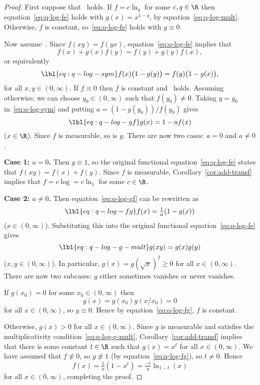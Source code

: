 \begin{proof}
First suppose that~ holds.  If $f = c\ln_q$ for some
$c, q \in \R$ then equation~\eqref{eq:q-log-fe} holds with $g(x) = x^{1 -
  q}$, by equation~\eqref{eq:q-log-mult}.  Otherwise, $f$ is constant,
so~\eqref{eq:q-log-fe} holds with $g \equiv 0$.

Now assume~.  Since $f(xy) = f(yx)$,
equation~\eqref{eq:q-log-fe} implies that
\[
f(x) + g(x) f(y) = f(y) + g(y) f(x),
\]
or equivalently
% 
\begin{equation}
\lbl{eq:q-log-sym}
f(x) \bigl(1 - g(y)\bigr) = f(y) \bigl(1 - g(x)\bigr),
\end{equation}
% 
for all $x, y \in (0, \infty)$.  If $f \equiv 0$ then $f$ is constant
and~ holds.  Assuming otherwise, we can choose $y_0
\in (0, \infty)$ such that $f(y_0) \neq 0$.  Taking $y = y_0$
in~\eqref{eq:q-log-sym} and putting $a = (1 - g(y_0))/f(y_0)$ gives
% 
\begin{equation}
\lbl{eq:q-log-gf}
g(x) = 1 - af(x)
\end{equation}
% 
($x \in \R$).  Since $f$ is measurable, so is $g$.  There are now two
cases: $a = 0$ and $a \neq 0$.

\textbf{Case 1: $a = 0$.}  Then $g \equiv 1$, so the original functional
equation~\eqref{eq:q-log-fe} states that $f(xy) = f(x) + f(y)$.  Since $f$
is measurable, Corollary~\ref{cor:add-transf}
implies that $f = c \log = c \ln_1$ for some $c \in \R$.

\textbf{Case 2: $a \neq 0$.}  Then equation~\eqref{eq:q-log-gf}
can be rewritten as
% 
\begin{equation}
\lbl{eq:q-log-fg}
f(x) = \tfrac{1}{a} (1 - g(x))
\end{equation}
% 
($x \in (0, \infty)$).  Substituting this into the original functional
equation~\eqref{eq:q-log-fe} gives 
% 
\begin{equation}
\lbl{eq:q-log-g-mult}
g(xy) = g(x)g(y)
\end{equation}
% 
($x, y \in (0, \infty)$).  In particular, $g(x) = g(\sqrt{x})^2 \geq 0$ for
all $x \in (0, \infty)$.  There are now two subcases: $g$ either sometimes
vanishes or never vanishes.

If $g(x_0) = 0$ for some $x_0 \in (0, \infty)$ then
\[
g(x) = g(x_0)g(x/x_0) = 0
\]
for all $x \in (0, \infty)$, so $g \equiv 0$.  Hence by
equation~\eqref{eq:q-log-fg}, $f$ is constant.

Otherwise, $g(x) > 0$ for all $x \in (0, \infty)$.  Since $g$ is measurable
and satisfies the multiplicativity condition~\eqref{eq:q-log-g-mult},
Corollary~\ref{cor:add-transf} implies that
there is some constant $t \in \R$ such that $g(x) = x^t$ for all $x \in (0,
\infty)$.  We have assumed that $f \not\equiv 0$, so $g \not\equiv 1$ (by
equation~\eqref{eq:q-log-fg}), so $t \neq 0$.  Hence
\[
f(x)
=
\tfrac{1}{a} (1 - x^t)
=
\tfrac{-t}{a}\ln_{1 - t}(x)
\]
for all $x \in (0, \infty)$, completing the proof.
\end{proof}


